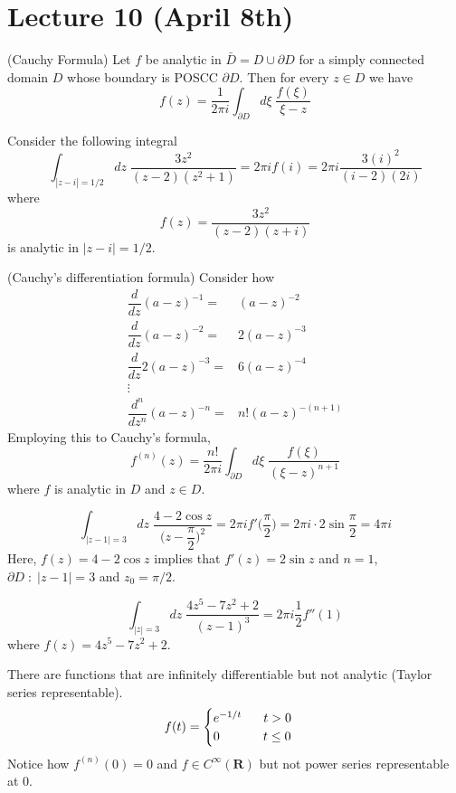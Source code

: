 \section{Lecture 10 (April 8th)}
\begin{thm}
(Cauchy Formula) Let $f$ be analytic in $\bar{D}=D\cup \partial D$ for a simply connected domain $D$ whose boundary is POSCC $\partial D$. Then for every $z\in D$ we have 
\[f(z)=\dfrac{1}{2\pi i}\int _{\partial D}d\xi \;\dfrac{f(\xi )}{\xi -z} \]
\end{thm}
\vspace{2ex}
\begin{ex}
Consider the following integral
\[\int _{|z-i|=1/2}dz\;\dfrac{3z^2}{(z-2)(z^2+1)}=2\pi if(i)=2\pi i\dfrac{3(i)^2}{(i-2)(2i)}\]
where
\[f(z)=\dfrac{3z^2}{(z-2)(z+i)}\]
is analytic in $|z-i|=1/2$.
\end{ex}
\vspace{2ex}
\begin{thm}
(Cauchy's differentiation formula) Consider how
\begin{align*}
\dfrac{d }{d z}(a-z)^{-1}=&(a-z)^{-2}\\
\dfrac{d }{d z}(a-z)^{-2}=&2(a-z)^{-3}\\
\dfrac{d }{d z}2(a-z)^{-3}=&6(a-z)^{-4}\\
\vdots\\
\dfrac{d ^{n}}{d z^{n}}(a-z)^{-n}=&n!(a-z)^{-(n+1)}
\end{align*}
Employing this to Cauchy's formula,
\[f^{(n)}(z)=\dfrac{n!}{2\pi i}\int _{\partial D}d\xi \;\dfrac{f(\xi )}{(\xi -z)^{n+1}} \]
where $f$ is analytic in $D$ and $z\in D$. 
\end{thm}
\vspace{2ex}
\begin{ex}
\[\int _{|z-1|=3}dz\;\dfrac{4-2\cos z}{\Big(z-\dfrac{\pi }{2}\Big)^2}=2\pi if'\Big(\dfrac{\pi }{2}\Big)=2\pi i\cdot  2\sin \dfrac{\pi }{2}=4\pi i\]
Here, $f(z)=4-2\cos z$ implies that $f'(z)=2\sin z$ and $n=1$, $\partial D\;:\;|z-1|=3$ and $z_0=\pi /2$.
\end{ex}
\vspace{2ex}
\begin{ex}
\[\int _{|z|=3}dz\;\dfrac{4z^{5}-7z^2+2}{(z-1)^3}=2\pi i\dfrac{1}{2}f''(1)\]
where $f(z)=4z^{5}-7z^2+2$. 
\end{ex}
\vspace{2ex}
\begin{rmk}
There are functions that are infinitely differentiable but not analytic (Taylor series representable).
\[f(t)=\begin{cases}
e^{-1/t}\hspace{4ex}t>0\\
0\hspace{8ex}t\leq 0
\end{cases}\]
Notice how $f^{(n)}(0)=0$ and $f\in C^{\infty }({\bm R})$ but not power series representable at 0.
\end{rmk}
